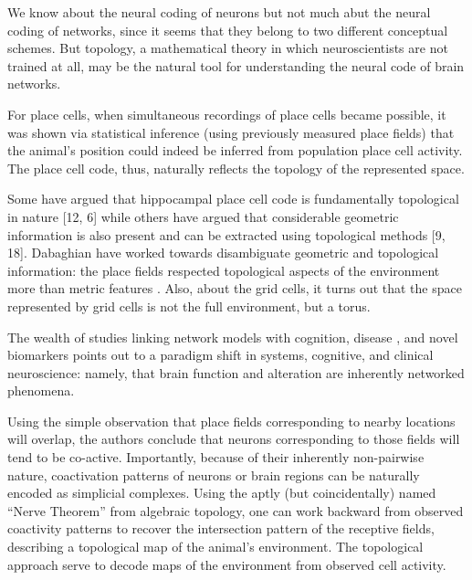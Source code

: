 \documentclass[onecollarge,runningheads]{svjour2}
\begin{document}
We know about the neural coding of neurons but not much abut the neural coding of networks, since it seems that they belong to two different conceptual schemes. But topology, a mathematical theory in which neuroscientists are not trained at all, may be the natural tool for understanding the neural code of brain networks.

For place cells, when simultaneous recordings of place cells became possible, it was shown via statistical inference (using previously measured place fields) that the animal's position could indeed be inferred from population place cell activity. The place cell code, thus, naturally reflects the topology of the represented space.

\cite{curto2016can} Some have argued that hippocampal place cell code is fundamentally topological in nature [12, 6] while others have argued that considerable geometric information is also present and can be extracted using topological methods [9, 18]. Dabaghian have worked towards disambiguate geometric and topological information: the place fields respected topological aspects of the environment more than metric features \cite{dabaghian2014reconceiving}. Also, about the grid cells, it turns out that the space represented by grid cells is not the full environment, but a torus.

The wealth of studies linking network models with cognition, disease \cite{stefan2013epileptic}, \cite{stam2014modern} and novel biomarkers points out to a paradigm shift in systems, cognitive, and clinical neuroscience: namely, that brain function and alteration are inherently networked phenomena.


Using the simple observation that place fields corresponding to nearby locations will overlap, the authors conclude that neurons corresponding to those fields will tend to be co-active. Importantly, because of their inherently non-pairwise nature, coactivation patterns of neurons or brain regions can be naturally encoded as simplicial complexes.
Using the aptly (but coincidentally) named “Nerve Theorem” from algebraic topology, one can work backward from observed coactivity patterns to recover the intersection pattern of the receptive fields, describing a topological map of the animal’s environment.
The topological approach serve to decode maps of the environment from observed cell activity.
\end{document}
